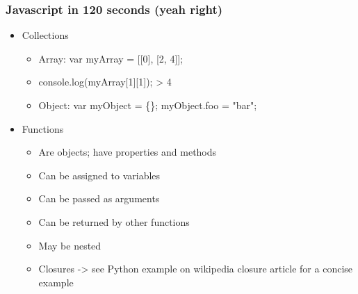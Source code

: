\documentclass{beamer}
\begin{document}
\begin{frame}
    \frametitle{Javascript in 120 seconds (yeah right)}
    \begin{itemize}
    \item Collections
        \begin{itemize}
\pause
        \item Array: var myArray = [[0], [2, 4]]; 
        \item console.log(myArray[1][1]); > 4
\pause
        \item Object: var myObject = \{\}; myObject.foo = "bar";
        \end{itemize}
\pause
    \item Functions
        \begin{itemize}
        \item Are objects; have properties and methods
        \item Can be assigned to variables
        \item Can be passed as arguments
        \item Can be returned by other functions
        \item May be nested
        \item Closures -> see Python example on wikipedia closure article for a concise example
        \end{itemize}
    \end{itemize}
\end{frame}

\end{document}
